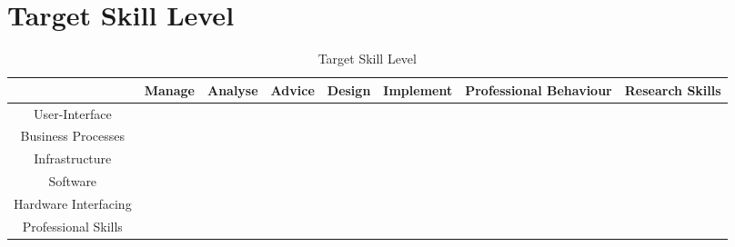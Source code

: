 
\section{Target Skill Level}
\label{sec:target}


\begin{table}[H]
	\centering
	\begin{tabular}{|c|c|c|c|c|c|c|c|}
		\hline
		& Manage & Analyse & Advice & Design & Implement & Professional Behaviour & Research Skills \\ \hline
		User-Interface & & & & & & & \\ \hline
		Business Processes & & & & & & & \\ \hline
		Infrastructure &  &  & &  &  & & \\ \hline
		Software & &  &  &  &  & & \\ \hline
		Hardware Interfacing & & & & & & & \\ \hline
		Professional Skills & & & & & &  \\ \hline             
	\end{tabular}
	\caption{Target Skill Level}
	\label{targetskills}
\end{table}